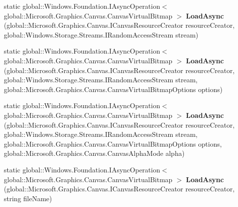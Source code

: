 \begin{DoxyCompactItemize}
\item 
\mbox{\label{class_microsoft_1_1_graphics_1_1_canvas_1_1_canvas_virtual_bitmap_a56e5e79a80dccfdc011f98e647de9bcf}} 
static global\+::\+Windows.\+Foundation.\+I\+Async\+Operation$<$ global\+::\+Microsoft.\+Graphics.\+Canvas.\+Canvas\+Virtual\+Bitmap $>$ {\bfseries Load\+Async} (global\+::\+Microsoft.\+Graphics.\+Canvas.\+I\+Canvas\+Resource\+Creator resource\+Creator, global\+::\+Windows.\+Storage.\+Streams.\+I\+Random\+Access\+Stream stream)
\item 
\mbox{\label{class_microsoft_1_1_graphics_1_1_canvas_1_1_canvas_virtual_bitmap_a8cdd19fd36f49f203d6c0998ace732d1}} 
static global\+::\+Windows.\+Foundation.\+I\+Async\+Operation$<$ global\+::\+Microsoft.\+Graphics.\+Canvas.\+Canvas\+Virtual\+Bitmap $>$ {\bfseries Load\+Async} (global\+::\+Microsoft.\+Graphics.\+Canvas.\+I\+Canvas\+Resource\+Creator resource\+Creator, global\+::\+Windows.\+Storage.\+Streams.\+I\+Random\+Access\+Stream stream, global\+::\+Microsoft.\+Graphics.\+Canvas.\+Canvas\+Virtual\+Bitmap\+Options options)
\item 
\mbox{\label{class_microsoft_1_1_graphics_1_1_canvas_1_1_canvas_virtual_bitmap_abba7eac1de7fc7da41f8546a18aef233}} 
static global\+::\+Windows.\+Foundation.\+I\+Async\+Operation$<$ global\+::\+Microsoft.\+Graphics.\+Canvas.\+Canvas\+Virtual\+Bitmap $>$ {\bfseries Load\+Async} (global\+::\+Microsoft.\+Graphics.\+Canvas.\+I\+Canvas\+Resource\+Creator resource\+Creator, global\+::\+Windows.\+Storage.\+Streams.\+I\+Random\+Access\+Stream stream, global\+::\+Microsoft.\+Graphics.\+Canvas.\+Canvas\+Virtual\+Bitmap\+Options options, global\+::\+Microsoft.\+Graphics.\+Canvas.\+Canvas\+Alpha\+Mode alpha)
\item 
\mbox{\label{class_microsoft_1_1_graphics_1_1_canvas_1_1_canvas_virtual_bitmap_a8596f4617ef7a7e9c1a1464d4674e40c}} 
static global\+::\+Windows.\+Foundation.\+I\+Async\+Operation$<$ global\+::\+Microsoft.\+Graphics.\+Canvas.\+Canvas\+Virtual\+Bitmap $>$ {\bfseries Load\+Async} (global\+::\+Microsoft.\+Graphics.\+Canvas.\+I\+Canvas\+Resource\+Creator resource\+Creator, string file\+Name)

\end{DoxyCompactItemize}
